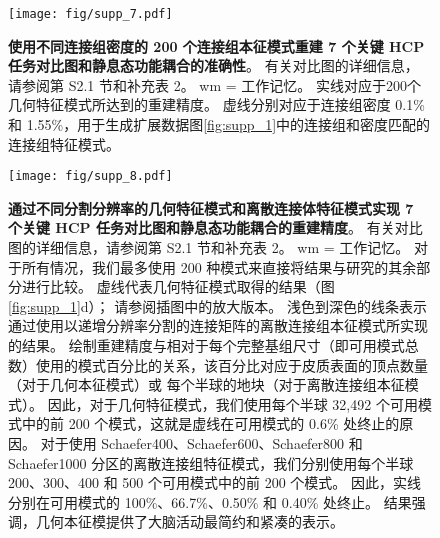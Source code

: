 \documentclass[lang=cn,a4paper,newtx]{elegantpaper}
\begin{document}
\begin{figure}[!htb] 
	\centering
	\texttt{[image: fig/supp\_7.pdf]}
	\caption{
		\textbf{使用不同连接组密度的 200 个连接组本征模式重建 7 个关键 HCP 任务对比图和静息态功能耦合的准确性}。
		有关对比图的详细信息，请参阅第 S2.1 节和补充表 2。
		wm = 工作记忆。
		实线对应于200个几何特征模式所达到的重建精度。
		虚线分别对应于连接组密度 0.1\% 和 1.55\%，用于生成扩展数据图\ref{fig:supp_1}中的连接组和密度匹配的连接组特征模式。
	} \label{fig:supp_7}
\end{figure}


\begin{figure}[!htb] 
	\centering
	\texttt{[image: fig/supp\_8.pdf]}
	\caption{
	\textbf{通过不同分割分辨率的几何特征模式和离散连接体特征模式实现 7 个关键 HCP 任务对比图和静息态功能耦合的重建精度}。
	有关对比图的详细信息，请参阅第 S2.1 节和补充表 2。 wm = 工作记忆。
	对于所有情况，我们最多使用 200 种模式来直接将结果与研究的其余部分进行比较。
	虚线代表几何特征模式取得的结果（图\ref{fig:supp_1}d）；
	请参阅插图中的放大版本。
	浅色到深色的线条表示通过使用以递增分辨率分割的连接矩阵的离散连接组本征模式所实现的结果。
	绘制重建精度与相对于每个完整基组尺寸（即可用模式总数）使用的模式百分比的关系，该百分比对应于皮质表面的顶点数量（对于几何本征模式）或 每个半球的地块（对于离散连接组本征模式）。
	因此，对于几何特征模式，我们使用每个半球 32,492 个可用模式中的前 200 个模式，这就是虚线在可用模式的 0.6\% 处终止的原因。
	对于使用 Schaefer400、Schaefer600、Schaefer800 和 Schaefer1000 分区的离散连接组特征模式，我们分别使用每个半球 200、300、400 和 500 个可用模式中的前 200 个模式。
	因此，实线分别在可用模式的 100\%、66.7\%、0.50\% 和 0.40\% 处终止。
	结果强调，几何本征模提供了大脑活动最简约和紧凑的表示。
	} \label{fig:supp_8}
\end{figure}














\nocite{*}
\printbibliography[heading=bibintoc, title=\ebibname]

\appendix
\addappheadtotoc
\end{document}
